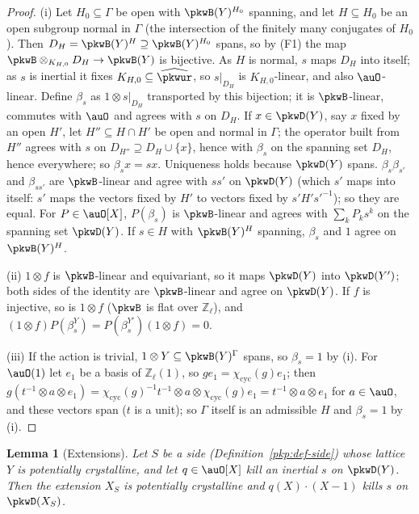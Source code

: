 \documentclass[10pt]{amsart}
\newtheorem{lemma}[theorem]{Lemma}
\theoremstyle{definition}
\theoremstyle{remark}
\newcommand{\Z}{\mathbb Z}
\begin{document}
\begin{proof}
(i) Let $H_0\subseteq\Gamma$ be open with $\pkwB(Y)^{H_0}$ spanning, and let $H\subseteq H_0$ be an open
subgroup normal in $\Gamma$ (the intersection of the finitely many conjugates of $H_0$). Then
$D_H=\pkwB(Y)^H\supseteq\pkwB(Y)^{H_0}$ spans, so by (F1) the map $\pkwB\otimes_{K_{H,0}}D_H\to\pkwB(Y)$
is bijective. As $H$ is normal, $s$ maps $D_H$ into itself; as $s$ is inertial it fixes
$K_{H,0}\subseteq\widehat{\pkwur}$, so $s|_{D_H}$ is $K_{H,0}$-linear, and also $\auO$-linear. Define
$\beta_s$ as $1\otimes s|_{D_H}$ transported by this bijection; it is $\pkwB$-linear, commutes with
$\auO$ and agrees with $s$ on $D_H$. If $x\in\pkwD(Y)$, say $x$ fixed by an open $H'$, let $H''\subseteq
H\cap H'$ be open and normal in $\Gamma$; the operator built from $H''$ agrees with $s$ on $D_{H''}\supseteq
D_H\cup\{x\}$, hence with $\beta_s$ on the spanning set $D_H$, hence everywhere; so $\beta_sx=sx$.
Uniqueness holds because $\pkwD(Y)$ spans. $\beta_s\beta_{s'}$ and $\beta_{ss'}$ are $\pkwB$-linear and
agree with $ss'$ on $\pkwD(Y)$ (which $s'$ maps into itself: $s'$ maps the vectors fixed by $H'$ to
vectors fixed by $s'H's'^{-1}$); so they are equal. For $P\in\auO[X]$, $P(\beta_s)$ is $\pkwB$-linear and
agrees with $\sum_kP_ks^k$ on the spanning set $\pkwD(Y)$. If $s\in H$ with $\pkwB(Y)^H$ spanning, $\beta_s$
and $1$ agree on $\pkwB(Y)^H$.

(ii) $1\otimes f$ is $\pkwB$-linear and equivariant, so it maps $\pkwD(Y)$ into $\pkwD(Y')$; both sides of
the identity are $\pkwB$-linear and agree on $\pkwD(Y)$. If $f$ is injective, so is $1\otimes f$
($\pkwB$ is flat over $\Z_\ell$), and $(1\otimes f)P(\beta^Y_s)=P(\beta^{Y'}_s)(1\otimes f)=0$.

(iii) If the action is trivial, $1\otimes Y\subseteq\pkwB(Y)^\Gamma$ spans, so $\beta_s=1$ by (i). For
$\auO(1)$ let $e_1$ be a basis of $\Z_\ell(1)$, so $ge_1=\chi_{\mathrm{cyc}}(g)e_1$; then
$g(t^{-1}\otimes a\otimes e_1)=\chi_{\mathrm{cyc}}(g)^{-1}t^{-1}\otimes a\otimes\chi_{\mathrm{cyc}}(g)e_1=
t^{-1}\otimes a\otimes e_1$ for $a\in\auO$, and these vectors span ($t$ is a unit); so $\Gamma$ itself is an
admissible $H$ and $\beta_s=1$ by (i).
\end{proof}

\begin{lemma}[Extensions]\label{pkw:ext}
Let $S$ be a side (Definition~\ref{pkp:def-side}) whose lattice $Y$ is potentially crystalline, and
let $q\in\auO[X]$ kill an inertial $s$ on $\pkwD(Y)$. Then the extension $X_S$ is potentially crystalline
and $q(X)\cdot(X-1)$ kills $s$ on $\pkwD(X_S)$.
\end{lemma}
\end{document}
